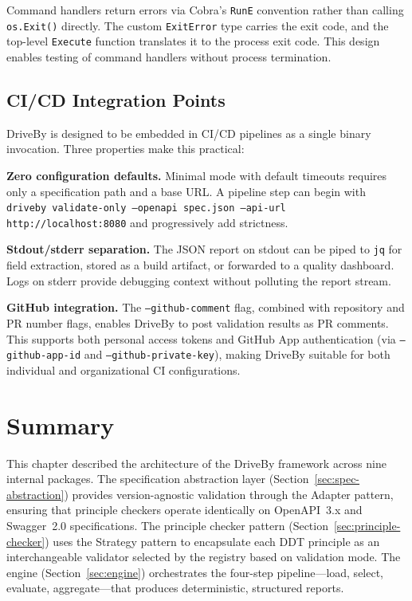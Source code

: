 Command handlers return errors via Cobra's \texttt{RunE} convention rather than calling \texttt{os.Exit()} directly. The custom \texttt{ExitError} type carries the exit code, and the top-level \texttt{Execute} function translates it to the process exit code. This design enables testing of command handlers without process termination.

\subsection{CI/CD Integration Points}
\label{subsec:cicd-integration}

DriveBy is designed to be embedded in CI/CD pipelines as a single binary invocation. Three properties make this practical:

\textbf{Zero configuration defaults.} Minimal mode with default timeouts requires only a specification path and a base URL. A pipeline step can begin with \texttt{driveby validate-only --openapi spec.json --api-url http://localhost:8080} and progressively add strictness.

\textbf{Stdout/stderr separation.} The JSON report on stdout can be piped to \texttt{jq} for field extraction, stored as a build artifact, or forwarded to a quality dashboard. Logs on stderr provide debugging context without polluting the report stream.

\textbf{GitHub integration.} The \texttt{--github-comment} flag, combined with repository and PR number flags, enables DriveBy to post validation results as PR comments. This supports both personal access tokens and GitHub App authentication (via \texttt{--github-app-id} and \texttt{--github-private-key}), making DriveBy suitable for both individual and organizational CI configurations.

\section{Summary}
\label{sec:architecture-summary}

This chapter described the architecture of the DriveBy framework across nine internal packages. The specification abstraction layer (Section~\ref{sec:spec-abstraction}) provides version-agnostic validation through the Adapter pattern, ensuring that principle checkers operate identically on OpenAPI~3.x and Swagger~2.0 specifications. The principle checker pattern (Section~\ref{sec:principle-checker}) uses the Strategy pattern to encapsulate each DDT principle as an interchangeable validator selected by the registry based on validation mode. The engine (Section~\ref{sec:engine}) orchestrates the four-step pipeline---load, select, evaluate, aggregate---that produces deterministic, structured reports.

